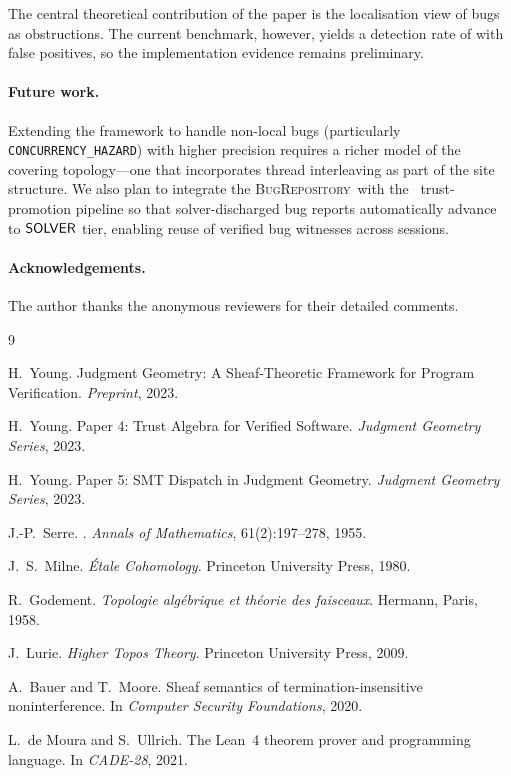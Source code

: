 \documentclass[11pt]{article}
\newcommand{\BugRepo}{\textsc{BugRepository}}     %
\begin{document}
The central theoretical contribution of the paper is the localisation
view of bugs as obstructions.  The current benchmark, however, yields a
detection rate of \subBugDetectionRate{} with
\subBugFalsePositiveRate{} false positives, so the implementation
evidence remains preliminary.

\paragraph{Future work.}
Extending the framework to handle non-local bugs (particularly
\texttt{CONCURRENCY\_HAZARD}) with higher precision requires a richer
model of the covering topology---one that incorporates thread interleaving
as part of the site structure.  We also plan to integrate the \BugRepo\
with the \JuGeo\ trust-promotion pipeline so that solver-discharged bug
reports automatically advance to $\mathsf{SOLVER}$ tier, enabling reuse of
verified bug witnesses across sessions.

\paragraph{Acknowledgements.}
The author thanks the anonymous reviewers for their detailed comments.

\begin{thebibliography}{9}

H.\ Young.
\newblock Judgment Geometry: A Sheaf-Theoretic Framework for Program
  Verification.
\newblock \textit{Preprint}, 2023.

H.\ Young.
\newblock Paper 4: Trust Algebra for Verified Software.
\newblock \textit{Judgment Geometry Series}, 2023.

H.\ Young.
\newblock Paper 5: SMT Dispatch in Judgment Geometry.
\newblock \textit{Judgment Geometry Series}, 2023.

J.-P.\ Serre.
.
\newblock \textit{Annals of Mathematics}, 61(2):197--278, 1955.

J.\ S.\ Milne.
\newblock \textit{\'{E}tale Cohomology}.
\newblock Princeton University Press, 1980.

R.\ Godement.
\newblock \textit{Topologie alg\'{e}brique et th\'{e}orie des faisceaux}.
\newblock Hermann, Paris, 1958.

J.\ Lurie.
\newblock \textit{Higher Topos Theory}.
\newblock Princeton University Press, 2009.

A.\ Bauer and T.\ Moore.
\newblock Sheaf semantics of termination-insensitive noninterference.
\newblock In \textit{Computer Security Foundations}, 2020.

L.\ de Moura and S.\ Ullrich.
\newblock The {Lean}~4 theorem prover and programming language.
\newblock In \textit{CADE-28}, 2021.

\end{thebibliography}
\end{document}
